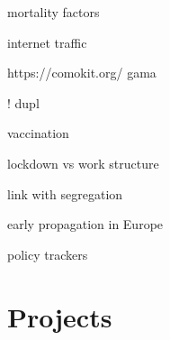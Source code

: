 \documentclass[10pt]{article}
\begin{document}
\cite{williamson2020opensafely} mortality factors

\cite{feldmann2020lockdown} internet traffic

https://comokit.org/ gama \cite{gaudou2020comokit}

\cite{murphy2020inside}

\cite{pullano2020underdetection}

\cite{mallapaty2020what}

\cite{Schlosser32883}

\cite{trump2020combine}

\cite{pullano2020underdetection} ! dupl

\cite{mallapaty2021covid} vaccination

\cite{heroy2020controlling} lockdown vs work structure

\cite{mallapaty2021major}

\cite{meng2021covid}

\cite{Torrats-Espinosae2015577118} link with segregation

\cite{nadeau2021origin} early propagation in Europe

\cite{schiermeier2021which} policy trackers





\section{Projects}
\end{document}
